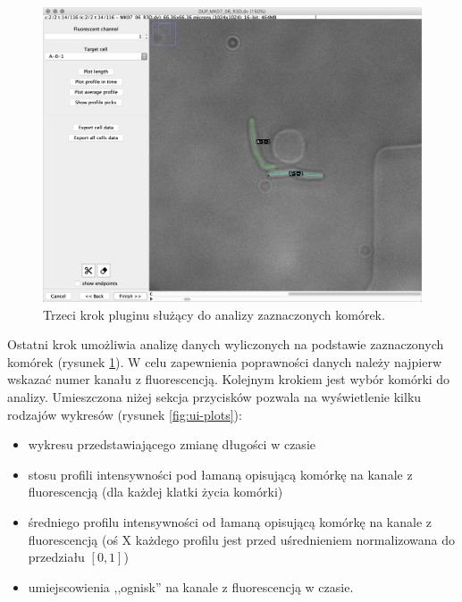 \documentclass[declaration,shortabstract,mgr]{iithesis}
\begin{document}
\begin{figure}
  \centering
  \includegraphics[width=\textwidth]{images/ui-step-measurements.png}
  \caption{Trzeci krok pluginu służący do analizy zaznaczonych komórek.}
  \label{fig:ui-step-measurements}
\end{figure}

Ostatni krok umożliwia analizę danych wyliczonych na podstawie zaznaczonych komórek (rysunek \ref{fig:ui-step-measurements}).
W celu zapewnienia poprawności danych należy najpierw wskazać numer kanału z fluorescencją. Kolejnym krokiem jest wybór komórki do analizy.
Umieszczona niżej sekcja przycisków pozwala na wyświetlenie kilku rodzajów wykresów (rysunek \ref{fig:ui-plots}):

\begin{itemize}
  \item wykresu przedstawiającego zmianę długości w czasie
  \item stosu profili intensywności pod łamaną opisującą komórkę na kanale z fluorescencją (dla każdej klatki życia komórki)
  \item średniego profilu intensywności od łamaną opisującą komórkę na kanale z fluorescencją (oś X każdego profilu jest przed uśrednieniem normalizowana do przedziału $[0, 1]$)
  \item umiejscowienia ,,ognisk'' na kanale z fluorescencją w czasie.
\end{itemize}
\end{document}
